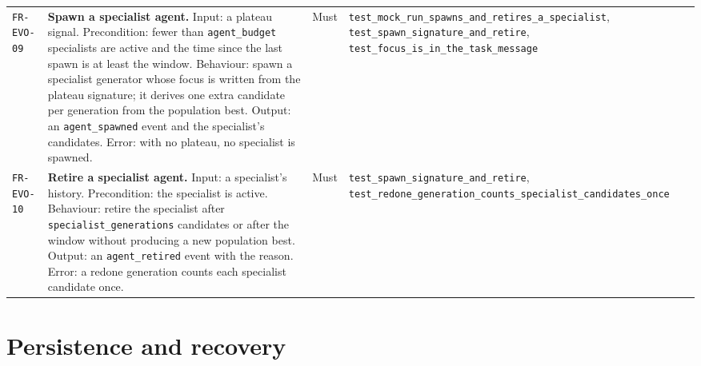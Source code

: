 \begin{longtable}{@{}>{\raggedright\arraybackslash}p{}>{\raggedright\arraybackslash}p{}p{}>{\raggedright\arraybackslash}p{}@{}}
\texttt{FR-EVO-09} & \textbf{Spawn a specialist agent.} Input: a plateau signal.
Precondition: fewer than \texttt{agent\_budget} specialists are active and the
time since the last spawn is at least the window. Behaviour: spawn a specialist
generator whose focus is written from the plateau signature; it derives one extra
candidate per generation from the population best. Output: an
\texttt{agent\_spawned} event and the specialist's candidates. Error: with no
plateau, no specialist is spawned. & Must & \texttt{test\_mock\_run\_spawns\_and\_retires\_a\_specialist},
\texttt{test\_spawn\_signature\_and\_retire}, \texttt{test\_focus\_is\_in\_the\_task\_message} \\
\addlinespace[2pt]

\texttt{FR-EVO-10} & \textbf{Retire a specialist agent.} Input: a specialist's
history. Precondition: the specialist is active. Behaviour: retire the specialist
after \texttt{specialist\_generations} candidates or after the window without
producing a new population best. Output: an \texttt{agent\_retired} event with the
reason. Error: a redone generation counts each specialist candidate once. & Must &
\texttt{test\_spawn\_signature\_and\_retire},
\texttt{test\_redone\_generation\_counts\_specialist\_candidates\_once} \\
\bottomrule
\end{longtable}

\section{Persistence and recovery}
\label{sec:fr-per}

